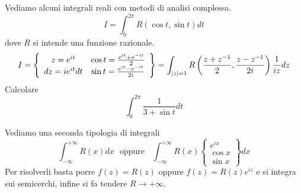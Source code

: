 Vediamo alcuni integrali reali con metodi di analisi complessa.
\begin{equation*}
I=\boxed{\int ^{2\pi }_{0} R\left(\cos t,\sin t\right) dt}
\end{equation*}
dove $R$ si intende una funzione razionale.
\begin{equation*}
I=\left\{\begin{array}{ c c }
z=e^{it} & \cos t=\frac{e^{it} +e^{-it}}{2}\\
dz=ie^{it} dt & \sin t=\frac{e^{it} -e^{-it}}{2i}
\end{array}\right\} =\int _{\left| z\right| =1} R\left(\frac{z+z^{-1}}{2} ,\frac{z-z^{-1}}{2i}\right)\frac{1}{iz} dz
\end{equation*}
Calcolare
\begin{equation*}
\int ^{2\pi }_{0}\frac{1}{3+\sin t} dt
\end{equation*}
\Esercizio{}

Vediamo una seconda tipologia di integrali
\begin{equation*}
\boxed{\int ^{+\infty }_{-\infty } R\left( x\right) dx} \ \ \ \text{oppure} \ \ \ \ \boxed{\int ^{+\infty }_{-\infty } R\left( x\right)\left\{\begin{array}{ c }
e^{ix}\\
\cos x\\
\sin x
\end{array}\right\} dx}
\end{equation*}
Per risolverli basta porre $f\left( z\right) =R\left( z\right)$ oppure $f\left( z\right) =R\left( z\right) e^{iz}$ e si integra sui semicerchi, infine si fa tendere $R\rightarrow +\infty $.

